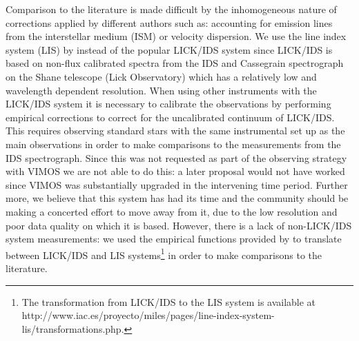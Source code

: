 	Comparison to the literature is made difficult by the inhomogeneous nature of corrections applied by different authors such as: accounting for emission lines from the interstellar medium (ISM) or velocity dispersion. We use the line index system (LIS) by \citet{Vazdekis2010} instead of the popular LICK/IDS system \citep{Faber1985, Worthey1994} since LICK/IDS is based on non-flux calibrated spectra from the IDS and Cassegrain spectrograph on the Shane telescope (Lick Observatory) which has a relatively low and wavelength dependent resolution. When using other instruments with the LICK/IDS system it is necessary to calibrate the observations by performing empirical corrections to correct for the uncalibrated continuum of LICK/IDS. This requires observing standard stars with the same instrumental set up as the main observations in order to make comparisons to the measurements from the IDS spectrograph. Since this was not requested as part of the observing strategy with VIMOS we are not able to do this: a later proposal would not have worked since VIMOS was substantially upgraded in the intervening time period. Further more, we believe that this system has had its time and the community should be making a concerted effort to move away from it, due to the low resolution and poor data quality on which it is based. However, there is a lack of non-LICK/IDS system measurements: we used the empirical functions provided by \citet{Vazdekis2010} to translate between LICK/IDS and LIS systems\footnote{The transformation from LICK/IDS to the LIS system is available at http://www.iac.es/proyecto/miles/pages/line-index-system-lis/transformations.php.} in order to make comparisons to the literature. 



